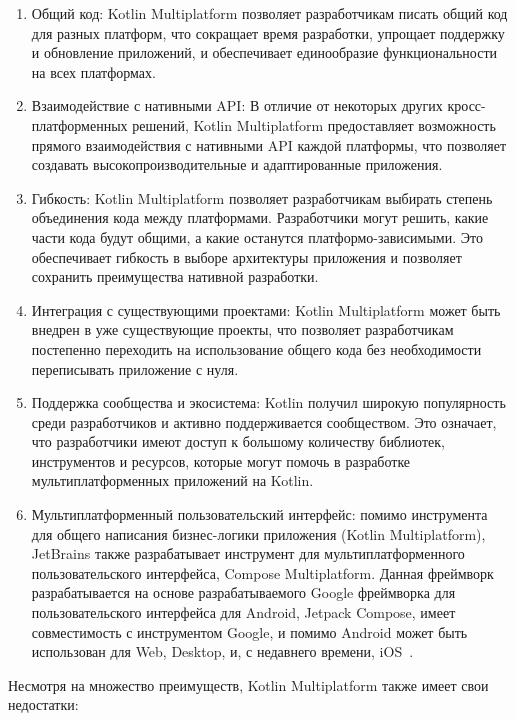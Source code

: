 \documentclass[14pt, russian]{scrartcl}
\begin{document}
\begin{enumerate}
    \item Общий код: Kotlin Multiplatform позволяет разработчикам писать общий код для разных платформ, что сокращает время разработки, упрощает поддержку и обновление приложений, и обеспечивает единообразие функциональности на всех платформах.
    \item Взаимодействие с нативными API: В отличие от некоторых других кросс-платформенных решений, Kotlin Multiplatform предоставляет возможность прямого взаимодействия с нативными API каждой платформы, что позволяет создавать высокопроизводительные и адаптированные приложения.
    \item Гибкость: Kotlin Multiplatform позволяет разработчикам выбирать степень объединения кода между платформами. Разработчики могут решить, какие части кода будут общими, а какие останутся платформо-зависимыми. Это обеспечивает гибкость в выборе архитектуры приложения и позволяет сохранить преимущества нативной разработки.
    \item Интеграция с существующими проектами: Kotlin Multiplatform может быть внедрен в уже существующие проекты, что позволяет разработчикам постепенно переходить на использование общего кода без необходимости переписывать приложение с нуля.
    \item Поддержка сообщества и экосистема: Kotlin получил широкую популярность среди разработчиков и активно поддерживается сообществом. Это означает, что разработчики имеют доступ к большому количеству библиотек, инструментов и ресурсов, которые могут помочь в разработке мультиплатформенных приложений на Kotlin.
    \item Мультиплатформенный пользовательский интерфейс: помимо инструмента для общего написания бизнес-логики приложения (Kotlin Multiplatform), JetBrains также разрабатывает инструмент для мультиплатформенного пользовательского интерфейса, Compose Multiplatform. Данная фреймворк разрабатывается на основе разрабатываемого Google фреймворка для пользовательского интерфейса для Android, Jetpack Compose, имеет совместимость с инструментом Google, и помимо Android может быть использован для Web, Desktop, и, с недавнего времени, iOS~\cite{ComposeMPiOS}.
\end{enumerate}

Несмотря на множество преимуществ, Kotlin Multiplatform также имеет свои недостатки:
\end{document}
